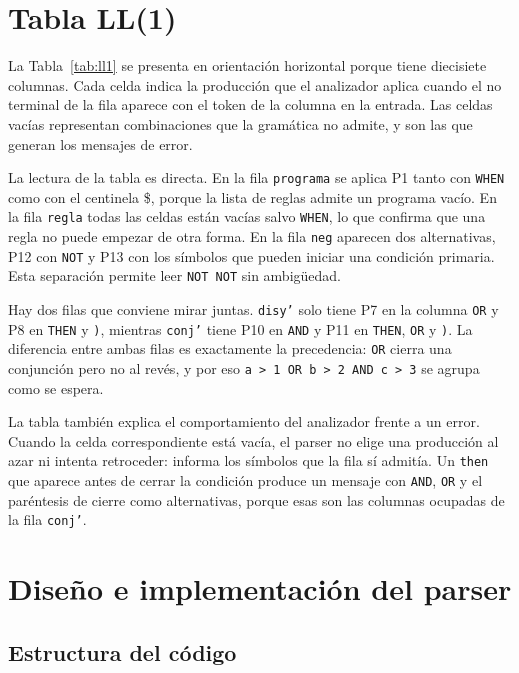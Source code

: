 \documentclass[11pt,letterpaper]{article}
\newcommand{\code}[1]{\texttt{#1}}
\begin{document}
\section{Tabla LL(1)}

La Tabla~\ref{tab:ll1} se presenta en orientación horizontal porque tiene diecisiete columnas. Cada celda indica la producción que el analizador aplica cuando el no terminal de la fila aparece con el token de la columna en la entrada. Las celdas vacías representan combinaciones que la gramática no admite, y son las que generan los mensajes de error.

La lectura de la tabla es directa. En la fila \code{programa} se aplica P1 tanto con \code{WHEN} como con el centinela \$, porque la lista de reglas admite un programa vacío. En la fila \code{regla} todas las celdas están vacías salvo \code{WHEN}, lo que confirma que una regla no puede empezar de otra forma. En la fila \code{neg} aparecen dos alternativas, P12 con \code{NOT} y P13 con los símbolos que pueden iniciar una condición primaria. Esta separación permite leer \code{NOT NOT} sin ambigüedad.

Hay dos filas que conviene mirar juntas. \code{disy'} solo tiene P7 en la columna \code{OR} y P8 en \code{THEN} y \code{)}, mientras \code{conj'} tiene P10 en \code{AND} y P11 en \code{THEN}, \code{OR} y \code{)}. La diferencia entre ambas filas es exactamente la precedencia: \code{OR} cierra una conjunción pero no al revés, y por eso \code{a > 1 OR b > 2 AND c > 3} se agrupa como se espera.

La tabla también explica el comportamiento del analizador frente a un error. Cuando la celda correspondiente está vacía, el parser no elige una producción al azar ni intenta retroceder: informa los símbolos que la fila sí admitía. Un \code{then} que aparece antes de cerrar la condición produce un mensaje con \code{AND}, \code{OR} y el paréntesis de cierre como alternativas, porque esas son las columnas ocupadas de la fila \code{conj'}.

\begin{landscape}
\thispagestyle{empty}

\end{landscape}

\section{Diseño e implementación del parser}

\subsection{Estructura del código}
\end{document}
